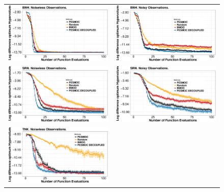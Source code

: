 \begin{figure}[H]
        \begin{tabular}{cc}
                \vspace{-.2cm}
                \includegraphics[width=0.475\linewidth]{Figures/benchmark/BNH.pdf} &
                \includegraphics[width=0.475\linewidth]{Figures/benchmark/BNH_noisy.pdf} \\
                \includegraphics[width=0.475\linewidth]{Figures/benchmark/SRN.pdf} &
                \includegraphics[width=0.475\linewidth]{Figures/benchmark/SRN_noisy.pdf} \\
                \includegraphics[width=0.475\linewidth]{Figures/benchmark/TNK.pdf} &

\end{tabular}
\end{figure}
